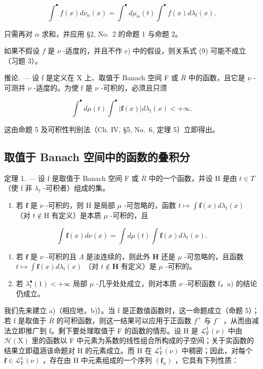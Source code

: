 \[
\int^ {\bullet} f (x) d \nu_ {\alpha} (x) = \int^ {\bullet} d \mu_ {\alpha} (t) \int^ {\bullet} f (x) d \lambda_ {t} (x).
\]

只需再对 \(\alpha\) 求和，并应用 §2, No.~2 的命题 1 与命题 2。

如果不假设 \(f\) 是 \(\nu\) -适度的，并且不作 c) 中的假设，则关系式 (9) 可能不成立（习题 3）。

推论. --- 设 f 是定义在 X 上、取值于 Banach 空间 F 或 \(\overline{R}\) 中的函数，且它是 \(\nu\) -可测并 \(\nu\) -适度的。为使 f 是 \(\nu\) -可积的，必须且只须

\[
\int^ {\bullet} d \mu (t) \int^ {\bullet} | \mathbf {f} (x) | d \lambda_ {t} (x) <   + \infty .
\]

这由命题 5 及可积性判别法（Ch. IV, §5, No.~6, 定理 5）立即得出。

\subsection{取值于 Banach 空间中的函数的叠积分}

定理 1. --- 设 f 是取值于 Banach 空间 F 或 \(\overline{R}\) 中的一个函数，并设 H 是由 \(t \in T\) （使 f 非 \(\lambda_{t}\) -可积者）组成的集。

\begin{enumerate}
\def\labelenumi{\alph{enumi})}
\tightlist
\item
  若 \(\mathbf{f}\) 是 \(\nu\) -可积的，则 \(\mathrm{H}\) 是局部 \(\mu\) -可忽略的，函数 \(t \mapsto \int \mathbf{f}(x)d\lambda_t(x)\) （对 \(t \notin \mathrm{H}\) 有定义）是本质 \(\mu\) -可积的，且
\end{enumerate}

\[
\int \mathbf {f} (x) d \nu (x) = \int d \mu (t) \int \mathbf {f} (x) d \lambda_ {t} (x).\tag{11}
\]

\begin{enumerate}
\def\labelenumi{\alph{enumi})}
\setcounter{enumi}{1}
\item
  若 \(\mathbf{f}\) 是 \(\nu\) -可积的且 \(\Lambda\) 是淡连续的，则此外 \(\mathbf{H}\) 还是 \(\mu\) -可忽略的，且函数 \(t \mapsto \int \mathbf{f}(x) d\lambda_t(x)\) （对 \(t \notin \mathbf{H}\) 有定义）是 \(\mu\) -可积的。
\item
  若 \(\lambda_t^\bullet(1) < +\infty\) 局部 \(\mu\) -几乎处处成立，则对本质 \(\nu\) -可积函数 f，a) 的结论仍成立。
\end{enumerate}

我们先来建立 a)（相应地，b)）。当 f 是正数值函数时，这一命题成立（命题 5）；若 f 是取值于 \(\overline{R}\) 的可积函数，则这一结果可以应用于正函数 \(f^{+}\) 与 \(f^{-}\) ，从而由减法立即推广到 f。剩下要处理取值于 F 的函数的情形。设 H 是 \(\mathcal{L}_{\mathrm{F}}^{1}(\nu)\) 中由 \(\mathcal{H}(\mathrm{X})\) 里的函数以 F 中元素为系数的线性组合所构成的子空间；关于实函数的结果立即蕴涵该命题对 H 的元素成立。而 H 在 \(\mathcal{L}_{\mathrm{F}}^{1}(\nu)\) 中稠密；因此，对每个 \(\mathbf{f} \in \mathcal{L}_{\mathrm{F}}^{1}(\nu)\) ，存在由 H 中元素组成的一个序列 \((\mathbf{f}_{n})\) ，它具有下列性质：

